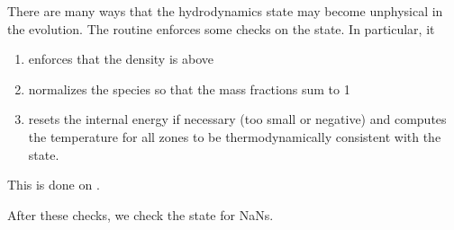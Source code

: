 \begin{enumerate}
  There are many ways that the hydrodynamics state may become
  unphysical in the evolution.  The  routine
  enforces some checks on the state.  In particular, it
  \begin{enumerate}
  \item enforces that the density is above 
  \item normalizes the species so that the mass fractions sum to 1
  \item resets the internal energy if necessary (too small or negative)
    and computes the temperature for all zones to be thermodynamically 
    consistent with the state.
  \end{enumerate}
  This is done on .

  After these checks, we check the state for NaNs.
 
\end{enumerate}




